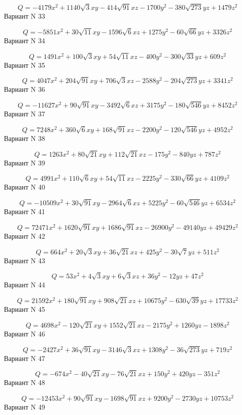 \documentclass[11pt]{report}
\begin{document}
$$Q = - 4179 x^{2} + 1140 \sqrt{3} x y - 414 \sqrt{91} x z - 1700 y^{2} - 380 \sqrt{273} y z + 1479 z^{2}$$Вариант N 33

$$Q = - 5851 x^{2} + 30 \sqrt{11} x y - 1596 \sqrt{6} x z + 1275 y^{2} - 60 \sqrt{66} y z + 3326 z^{2}$$Вариант N 34

$$Q = 1491 x^{2} + 100 \sqrt{3} x y + 54 \sqrt{11} x z - 400 y^{2} - 300 \sqrt{33} y z + 609 z^{2}$$Вариант N 35

$$Q = 4047 x^{2} + 204 \sqrt{91} x y + 706 \sqrt{3} x z - 2588 y^{2} - 204 \sqrt{273} y z + 3341 z^{2}$$Вариант N 36

$$Q = - 11627 x^{2} + 90 \sqrt{91} x y - 3492 \sqrt{6} x z + 3175 y^{2} - 180 \sqrt{546} y z + 8452 z^{2}$$Вариант N 37

$$Q = 7248 x^{2} + 360 \sqrt{6} x y + 168 \sqrt{91} x z - 2200 y^{2} - 120 \sqrt{546} y z + 4952 z^{2}$$Вариант N 38

$$Q = 1263 x^{2} + 80 \sqrt{21} x y + 112 \sqrt{21} x z - 175 y^{2} - 840 y z + 787 z^{2}$$Вариант N 39

$$Q = 4991 x^{2} + 110 \sqrt{6} x y + 54 \sqrt{11} x z - 2225 y^{2} - 330 \sqrt{66} y z + 4109 z^{2}$$Вариант N 40

$$Q = - 10509 x^{2} + 30 \sqrt{91} x y - 2964 \sqrt{6} x z + 5225 y^{2} - 60 \sqrt{546} y z + 6534 z^{2}$$Вариант N 41

$$Q = 72471 x^{2} + 1620 \sqrt{91} x y + 1686 \sqrt{91} x z - 26900 y^{2} - 49140 y z + 49429 z^{2}$$Вариант N 42

$$Q = 664 x^{2} + 20 \sqrt{3} x y + 36 \sqrt{21} x z + 425 y^{2} - 30 \sqrt{7} y z + 511 z^{2}$$Вариант N 43

$$Q = 53 x^{2} + 4 \sqrt{3} x y + 6 \sqrt{3} x z + 36 y^{2} - 12 y z + 47 z^{2}$$Вариант N 44

$$Q = 21592 x^{2} + 180 \sqrt{91} x y + 908 \sqrt{21} x z + 10675 y^{2} - 630 \sqrt{39} y z + 17733 z^{2}$$Вариант N 45

$$Q = 4698 x^{2} - 120 \sqrt{21} x y + 1552 \sqrt{21} x z - 2175 y^{2} + 1260 y z - 1898 z^{2}$$Вариант N 46

$$Q = - 2427 x^{2} + 36 \sqrt{91} x y - 3146 \sqrt{3} x z + 1308 y^{2} - 36 \sqrt{273} y z + 719 z^{2}$$Вариант N 47

$$Q = - 674 x^{2} - 40 \sqrt{21} x y - 76 \sqrt{21} x z + 150 y^{2} + 420 y z - 351 z^{2}$$Вариант N 48

$$Q = - 12453 x^{2} + 90 \sqrt{91} x y - 1698 \sqrt{91} x z + 9200 y^{2} - 2730 y z + 10753 z^{2}$$Вариант N 49
\end{document}
